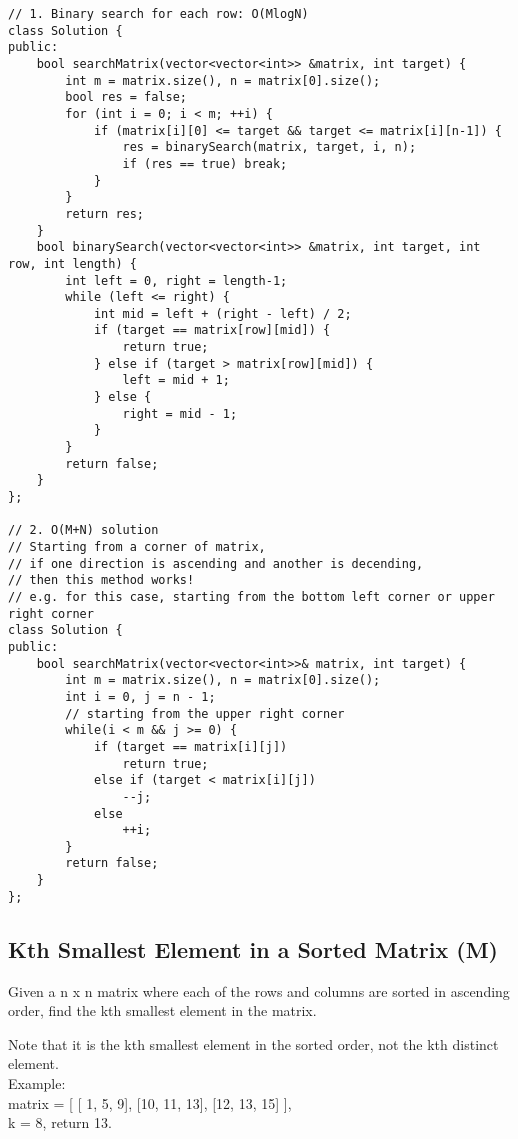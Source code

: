\begin{lstlisting}
// 1. Binary search for each row: O(MlogN)
class Solution {
public:
    bool searchMatrix(vector<vector<int>> &matrix, int target) {
        int m = matrix.size(), n = matrix[0].size();
        bool res = false;
        for (int i = 0; i < m; ++i) {
            if (matrix[i][0] <= target && target <= matrix[i][n-1]) {
                res = binarySearch(matrix, target, i, n);
                if (res == true) break;
            }
        }
        return res;
    }
    bool binarySearch(vector<vector<int>> &matrix, int target, int row, int length) {
        int left = 0, right = length-1;
        while (left <= right) {
            int mid = left + (right - left) / 2;
            if (target == matrix[row][mid]) {
                return true;
            } else if (target > matrix[row][mid]) {
                left = mid + 1;
            } else {
                right = mid - 1;
            }
        }
        return false;
    }
};

// 2. O(M+N) solution
// Starting from a corner of matrix, 
// if one direction is ascending and another is decending,
// then this method works!
// e.g. for this case, starting from the bottom left corner or upper right corner
class Solution {
public:
    bool searchMatrix(vector<vector<int>>& matrix, int target) {
        int m = matrix.size(), n = matrix[0].size();
        int i = 0, j = n - 1;
        // starting from the upper right corner
        while(i < m && j >= 0) {
            if (target == matrix[i][j])
                return true;
            else if (target < matrix[i][j])
                --j;
            else
                ++i;
        }
        return false;
    }
};
\end{lstlisting}


\subsection{Kth Smallest Element in a Sorted Matrix (M)}
Given a n x n matrix where each of the rows and columns are sorted in ascending order, find the kth smallest element in the matrix.\

Note that it is the kth smallest element in the sorted order, not the kth distinct element.\\

Example:\\
matrix = [
   [ 1,  5,  9],
   [10, 11, 13],
   [12, 13, 15]
],\\
k = 8, return 13.\\

